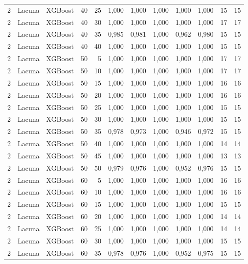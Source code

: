 \begin{longtable}{@{}rllrrrrrrrrr@{}}
2 & Lacuna & XGBoost & 40 & 25 & 1,000 & 1,000 & 1,000 & 1,000 & 1,000 & 15 & 15 \\
2 & Lacuna & XGBoost & 40 & 30 & 1,000 & 1,000 & 1,000 & 1,000 & 1,000 & 17 & 17 \\
2 & Lacuna & XGBoost & 40 & 35 & 0,985 & 0,981 & 1,000 & 0,962 & 0,980 & 15 & 15 \\
2 & Lacuna & XGBoost & 40 & 40 & 1,000 & 1,000 & 1,000 & 1,000 & 1,000 & 15 & 15 \\
2 & Lacuna & XGBoost & 50 & 5 & 1,000 & 1,000 & 1,000 & 1,000 & 1,000 & 17 & 17 \\
2 & Lacuna & XGBoost & 50 & 10 & 1,000 & 1,000 & 1,000 & 1,000 & 1,000 & 17 & 17 \\
2 & Lacuna & XGBoost & 50 & 15 & 1,000 & 1,000 & 1,000 & 1,000 & 1,000 & 16 & 16 \\
2 & Lacuna & XGBoost & 50 & 20 & 1,000 & 1,000 & 1,000 & 1,000 & 1,000 & 16 & 16 \\
2 & Lacuna & XGBoost & 50 & 25 & 1,000 & 1,000 & 1,000 & 1,000 & 1,000 & 15 & 15 \\
2 & Lacuna & XGBoost & 50 & 30 & 1,000 & 1,000 & 1,000 & 1,000 & 1,000 & 15 & 15 \\
2 & Lacuna & XGBoost & 50 & 35 & 0,978 & 0,973 & 1,000 & 0,946 & 0,972 & 15 & 15 \\
2 & Lacuna & XGBoost & 50 & 40 & 1,000 & 1,000 & 1,000 & 1,000 & 1,000 & 14 & 14 \\
2 & Lacuna & XGBoost & 50 & 45 & 1,000 & 1,000 & 1,000 & 1,000 & 1,000 & 13 & 13 \\
2 & Lacuna & XGBoost & 50 & 50 & 0,979 & 0,976 & 1,000 & 0,952 & 0,976 & 15 & 15 \\
2 & Lacuna & XGBoost & 60 & 5 & 1,000 & 1,000 & 1,000 & 1,000 & 1,000 & 16 & 16 \\
2 & Lacuna & XGBoost & 60 & 10 & 1,000 & 1,000 & 1,000 & 1,000 & 1,000 & 16 & 16 \\
2 & Lacuna & XGBoost & 60 & 15 & 1,000 & 1,000 & 1,000 & 1,000 & 1,000 & 15 & 15 \\
2 & Lacuna & XGBoost & 60 & 20 & 1,000 & 1,000 & 1,000 & 1,000 & 1,000 & 14 & 14 \\
2 & Lacuna & XGBoost & 60 & 25 & 1,000 & 1,000 & 1,000 & 1,000 & 1,000 & 14 & 14 \\
2 & Lacuna & XGBoost & 60 & 30 & 1,000 & 1,000 & 1,000 & 1,000 & 1,000 & 15 & 15 \\
2 & Lacuna & XGBoost & 60 & 35 & 0,978 & 0,976 & 1,000 & 0,952 & 0,975 & 15 & 15 \\

\end{longtable}
